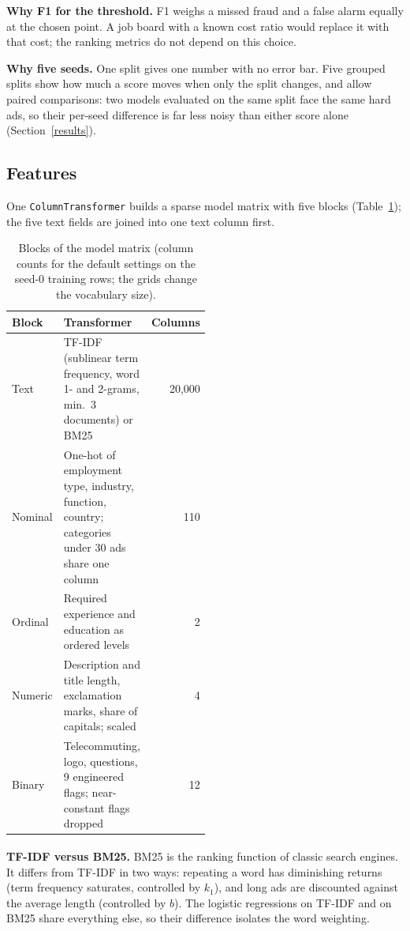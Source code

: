 \textbf{Why F1 for the threshold.} F1 weighs a missed fraud and a false alarm equally at the chosen
point. A job board with a known cost ratio would replace it with that cost; the ranking metrics do
not depend on this choice.

\textbf{Why five seeds.} One split gives one number with no error bar. Five grouped splits show how
much a score moves when only the split changes, and allow paired comparisons: two models evaluated
on the same split face the same hard ads, so their per-seed difference is far less noisy than
either score alone (Section~\ref{results}).

\subsection{Features}

One \texttt{ColumnTransformer} builds a sparse model matrix with five blocks
(Table~\ref{tab:features}); the five text fields are joined into one text column first.

\begin{table}[tb]
\centering
\small
\begin{tabular}{l>{\raggedright\arraybackslash}p{0.5\linewidth}r}
\toprule
\textbf{Block} & \textbf{Transformer} & \textbf{Columns} \\
\midrule
Text & TF-IDF (sublinear term frequency, word 1- and 2-grams, min.\ 3 documents) or BM25 & 20,000 \\
Nominal & One-hot of employment type, industry, function, country; categories under 30 ads share one column & 110 \\
Ordinal & Required experience and education as ordered levels & 2 \\
Numeric & Description and title length, exclamation marks, share of capitals; scaled & 4 \\
Binary & Telecommuting, logo, questions, 9 engineered flags; near-constant flags dropped & 12 \\
\bottomrule
\end{tabular}
\caption{Blocks of the model matrix (column counts for the default settings on the seed-0
training rows; the grids change the vocabulary size).}
\label{tab:features}
\end{table}

\textbf{TF-IDF versus BM25.} BM25\textsuperscript{\cite{robertson2009}} is the ranking function of
classic search engines. It differs from TF-IDF in two ways: repeating a word has diminishing
returns (term frequency saturates, controlled by $k_1$), and long ads are discounted against the
average length (controlled by $b$). The logistic regressions on TF-IDF and on BM25 share
everything else, so their difference isolates the word weighting.

